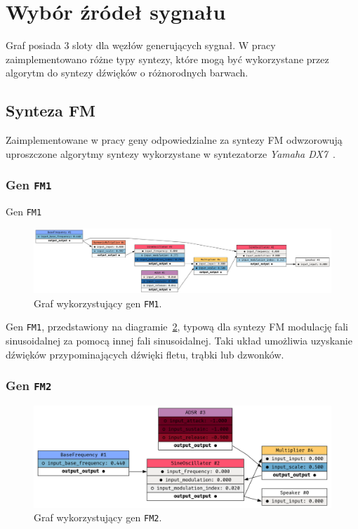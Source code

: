 \section{Wybór źródeł sygnału}

Graf posiada 3 sloty dla węzłów generujących sygnał. W pracy zaimplementowano różne
typy syntezy, które mogą być wykorzystane przez algorytm do syntezy dźwięków o różnorodnych barwach. 

\subsection{Synteza FM}

Zaimplementowane w pracy geny odpowiedzialne za syntezy FM odwzorowują uproszczone algorytmy syntezy wykorzystane
w syntezatorze \textit{Yamaha DX7}~\cite{yamaha_dx7_manual}.

\subsubsection{Gen \texttt{FM1}}

Gen \texttt{FM1}

\begin{figure}[H]
    \centering
    \includegraphics[width=1.0\linewidth]{rys06/gene_fm1.png}
    \caption{
      Graf wykorzystujący gen \texttt{FM1}.
    }\label{fig:gene_f1}
\end{figure}


Gen \texttt{FM1}, przedstawiony na diagramie~\ref{fig:gene_f2}, typową dla syntezy FM
modulację fali sinusoidalnej za pomocą innej fali sinusoidalnej. Taki układ umożliwia
uzyskanie dźwięków przypominających dźwięki fletu, trąbki lub dzwonków.

\subsubsection{Gen \texttt{FM2}}

\begin{figure}[H]
    \centering
    \includegraphics[width=1.0\linewidth]{rys06/gene_fm2.png}
    \caption{
      Graf wykorzystujący gen \texttt{FM2}.
    }\label{fig:gene_f2}
\end{figure}

